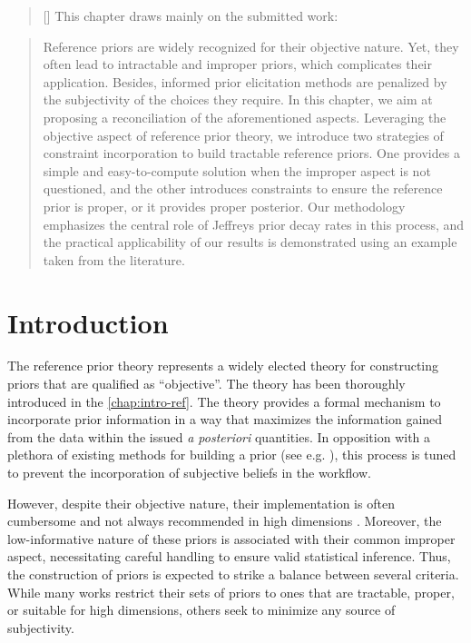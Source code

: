 

\begin{abstract}[\hspace*{-10pt}]
    This chapter draws mainly on the submitted work:   %
\end{abstract}

\begin{abstract}
    Reference priors are widely recognized for their objective nature. Yet, they often lead to intractable and improper priors, which complicates their application.
Besides, informed prior elicitation methods are penalized by the subjectivity of the choices they require. %
In this chapter, we aim at proposing a reconciliation of the aforementioned aspects. Leveraging the objective aspect of reference prior theory, we introduce two strategies of constraint incorporation to build tractable reference priors.
One provides a simple and easy-to-compute solution when the improper aspect is not questioned, and the other introduces constraints to ensure the reference prior is proper, or it provides proper posterior.
Our methodology emphasizes the central role of Jeffreys prior decay rates in this process, and the practical applicability of our results is demonstrated using an example taken from the literature.
\end{abstract}

\minitoc



\section{Introduction}\label{sec:BA:intro}


The reference prior theory represents a widely elected theory for constructing priors that are qualified as ``objective''.
The theory has been thoroughly introduced in the \cref{chap:intro-ref}. %
The theory provides a formal mechanism to incorporate prior information in a way that maximizes the information gained from the data within the issued \emph{a posteriori} quantities.
In opposition with a plethora of existing  methods for building a prior (see e.g. \cite{mikkola_prior_2023}), 
this process is tuned to prevent the incorporation of subjective beliefs in the workflow.


However, despite their  objective nature,  their implementation is often cumbersome and not always recommended in high dimensions \citep{berger_overall_2015}. %
Moreover, the low-informative nature of these priors is associated with their common improper aspect, necessitating careful handling to ensure valid statistical inference.
Thus, the construction of priors is expected to strike a balance between several criteria. While many works restrict their sets of priors to ones that are tractable, proper, or suitable for high dimensions, others seek to minimize any source of subjectivity.

